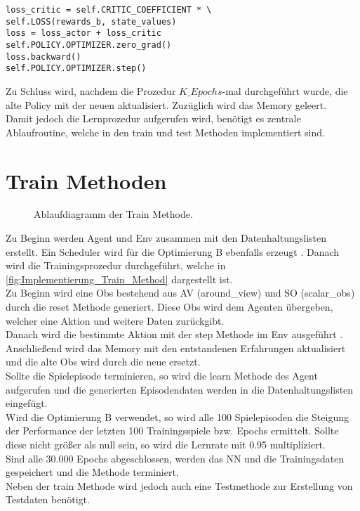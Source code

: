 \newpage
\begin{lstlisting}[caption=Bestimmung des PPO-Losses und Update der Netze, label=code:Bestimmung_PPO_Losses_update_NN, style=Python]
loss_critic = self.CRITIC_COEFFICIENT * \ 
self.LOSS(rewards_b, state_values)
loss = loss_actor + loss_critic 
self.POLICY.OPTIMIZER.zero_grad()
loss.backward()
self.POLICY.OPTIMIZER.step()
\end{lstlisting}
Zu Schluss wird, nachdem die Prozedur $K\_Epochs$-mal durchgeführt wurde, die alte Policy mit der neuen aktualisiert. Zuzüglich wird das Memory geleert.\\
Damit jedoch die Lernprozedur aufgerufen wird, benötigt es zentrale Ablaufroutine, welche in den train und test Methoden implementiert sind.

\section{Train Methoden} \label{sec:Implementierung_train_Methode}
\begin{figure}[H]
	\centering
	
	\caption[Ablaufdiagramm der train Methode]{Ablaufdiagramm der Train Methode.}
	\label{fig:Implementierung_Train_Method}
\end{figure}
Zu Beginn werden Agent und Env zusammen mit den Datenhaltungslisten  erstellt. Ein Scheduler wird für die Optimierung B ebenfalls erzeugt . Danach wird die Trainingsprozedur durchgeführt, welche in \autoref{fig:Implementierung_Train_Method} dargestellt ist.\\
Zu Beginn wird eine Obs bestehend aus AV (around\_view) und SO (scalar\_obs) durch die reset Methode \fullref{subsec:Konzept_Schnittstelle} generiert. 
Diese Obs wird dem Agenten übergeben, welcher eine Aktion und weitere Daten zurückgibt.\\
Danach wird die bestimmte Aktion mit der step Methode im Env ausgeführt .
Anschließend wird das Memory mit den entstandenen Erfahrungen aktualisiert und die alte Obs wird durch die neue ersetzt.\\
Sollte die Spielepisode terminieren, so wird die learn Methode des Agent aufgerufen und die generierten Episodendaten werden in die Datenhaltungslisten eingefügt.\\
Wird die Optimierung B verwendet, so wird alle 100 Spielepisoden die Steigung der Performance der letzten 100 Trainingsspiele bzw. Epochs ermittelt. Sollte diese nicht größer als null sein, so wird die Lernrate mit 0.95 multipliziert.\\
Sind alle 30.000 Epochs abgeschlossen, werden das NN und die Trainingsdaten gespeichert und die Methode terminiert.\\
Neben der train Methode wird jedoch auch eine Testmethode zur Erstellung von Testdaten benötigt.

